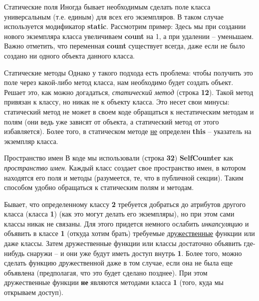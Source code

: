 \begin{lecture}[\lectureSubject]
		\begin{lecSection}
			\begin{lecSubsection}{Статические поля}
				Иногда бывает необходимым сделать поле класса универсальным (т.е. единым) для всех его экземпляров. В таком случае используется модификатор \textbf{static}. Рассмотрим пример:
				Здесь мы при создании нового экземпляра класса увеличиваем \textbf{count} на 1, а при удалении -- уменьшаем. Важно отметить, что переменная \textbf{count} существует всегда, даже если не было создано ни одного объекта данного класса.
			\end{lecSubsection}
			\begin{lecSubsection}{Статические методы}
				Однако у такого подхода есть проблема: чтобы получить это поле через какой-либо метод класса, нам необходимо будет создать объект. Решает это, как можно догадаться, \textit{статический метод} (строка \textbf{12}). Такой метод привязан к классу, но никак не к объекту класса. Это несет свои минусы: статический метод не может в своем коде обращаться к нестатическим методам и полям (они ведь уже зависят от объекта, а статический метод от этого избавляется). Более того, в статическом методе \underline{не} определен \textbf{this} -- указатель на экземпляр класса.
			\end{lecSubsection}
			
			\begin{lecSubsection}{Пространство имен}
				В коде мы использовали (строка \textbf{32}) \textbf{SelfCounter} как \textit{пространство имен}. Каждый класс создает свое пространство имен, в котором находятся его поля и методы (разумеется, те, что в публичной секции). Таким способом удобно обращаться к статическим полям и методам.
			\end{lecSubsection}
		\end{lecSection}
		
		\begin{lecSection}
			Бывает, что определенному классу \textbf{2} требуется добраться до атрибутов другого класса (класса \textbf{1}) (как это могут делать его экземпляры), но при этом сами классы никак не связаны. Для этого придется немного ослабить \textit{инкапсуляцию} и объявить в классе \textbf{1} (откуда хотим брать) требуемые \underline{дружественные} функции или даже классы. Затем дружественные функции или классы достаточно объявить где-нибудь снаружи -- и они уже будут иметь доступ внутрь \textbf{1}. Более того, можно сделать функцию дружественной даже в том случае, если она не была еще объявлена (предполагая, что это будет сделано позднее). При этом дружественные функции \textbf{не} являются методами класса \textbf{1} (того, куда мы открываем доступ).
			

\end{lecSection}
\end{lecture}

